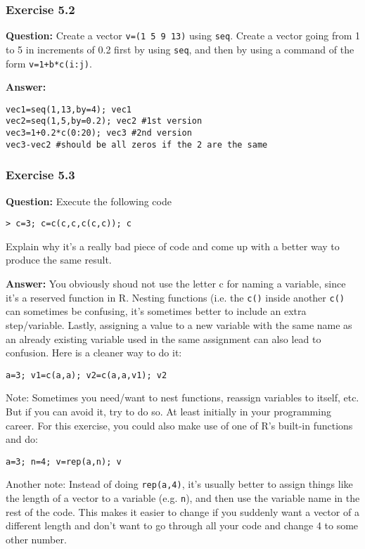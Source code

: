 \documentclass [11pt]{article}
\newcommand{\code}[1]{{\tt #1}}
\newcommand\R{{\sf R}}
\begin{document}
\subsubsection*{Exercise 5.2}
\textbf{Question:} Create a vector \texttt{v=(1 5 9 13)} using \texttt{seq}.  
Create a vector going from 1 to 5 in increments of 0.2 first by using  \texttt{seq},
and then by using a command of the form \texttt{v=1+b*c(i:j)}. 

\textbf{Answer:}
\begin{verbatim}
vec1=seq(1,13,by=4); vec1
vec2=seq(1,5,by=0.2); vec2 #1st version
vec3=1+0.2*c(0:20); vec3 #2nd version
vec3-vec2 #should be all zeros if the 2 are the same
\end{verbatim}

\subsubsection*{Exercise 5.3}
\textbf{Question:} Execute the following code 
\begin{verbatim}
> c=3; c=c(c,c,c(c,c)); c
\end{verbatim}
Explain why it's a really bad piece of code and come up with a better way to produce the same result.


\textbf{Answer:} You obviously shoud not use the letter c for naming a variable, since it's a reserved function in \R. Nesting functions (i.e. the \code{c()} inside another \code{c()} can sometimes be confusing, it's sometimes better to include an extra step/variable. Lastly, assigning a value to a new variable with the same name as an already existing variable used in the same assignment can also lead to confusion. Here is a cleaner way to do it:
\begin{verbatim}
a=3; v1=c(a,a); v2=c(a,a,v1); v2
\end{verbatim}
Note: Sometimes you need/want to nest functions, reassign variables to itself, etc. But if you can avoid it, try to do so. At least initially in your programming career. 
For this exercise, you could also make use of one of \R's built-in functions and do:
\begin{verbatim}
a=3; n=4; v=rep(a,n); v
\end{verbatim}
Another note: Instead of doing \code{rep(a,4)}, it's usually better to assign things like the length of a vector to a variable (e.g. \code{n}), and then use the variable name in the rest of the code. This makes it easier to change if you suddenly want a vector of a different length and don't want to go through all your code and change 4 to some other number.
\end{document}
